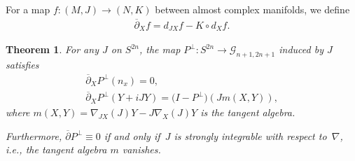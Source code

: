 \documentclass[10pt,a4paper]{amsart}
\newtheorem{thm}{Theorem}[section]
\numberwithin{equation}{section}
\newcommand{\cG}{{\mathcal G}}
\begin{document}
For a map $f\colon (M,J) \to (N,K) $ between almost complex manifolds, we define
\begin{gather*}
\overline{\partial}_X f = d_{JX} f - K \circ d_X f.
\end{gather*}

\begin{thm} \label{thm;delbarPperp}
For any $J$ on $S^{2n}$, the map $P^\perp\colon S^{2n} \to \cG_{n+1,2n+1}$ induced by $J$ satisfies
\begin{gather*}
\overline{\partial}_X P^\perp (n_x) = 0, \\
\overline{\partial}_X P^\perp (Y+iJY) = \big( I - P^\perp\big) (J m(X,Y)),
\end{gather*}
where $m(X,Y) = \nabla_{JX} (J)Y - J \nabla_X (J) Y$ is the tangent algebra.

Furthermore, $\overline{\partial} P^\perp \equiv 0$ if and only if~$J $ is strongly integrable with respect to~$\nabla$, i.e., the tangent algebra $m$ vanishes.
\end{thm}
\end{document}

